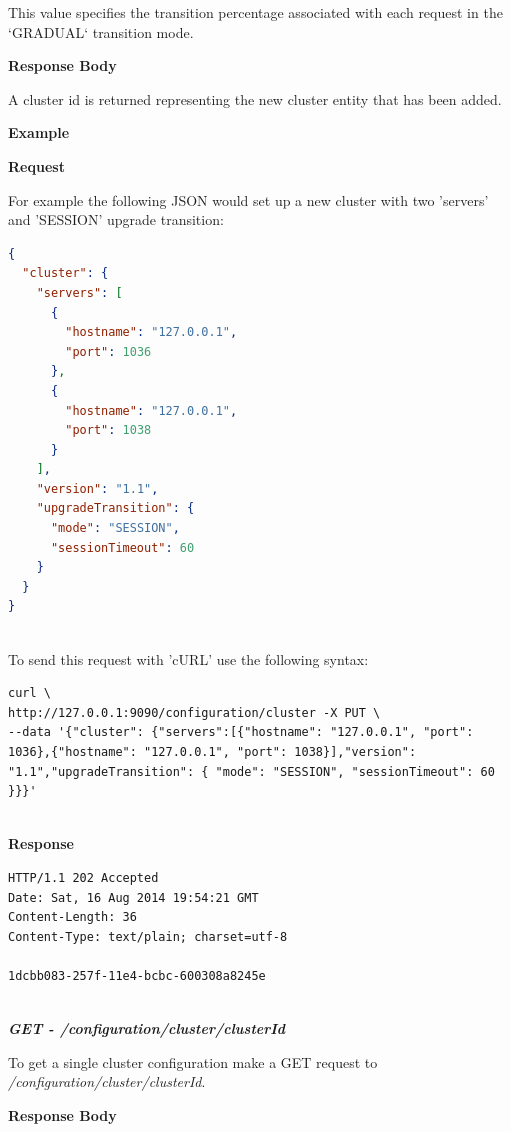 \documentclass[a4paper,11pt,twoside]{report}
\begin{document}
\noindent
This value specifies the transition percentage associated with each request in the `GRADUAL` transition mode. \bigskip

\noindent
\textbf{Response Body}

\noindent
A cluster id is returned representing the new cluster entity that has been added. \bigskip

\noindent
\textbf{Example}\bigskip

\noindent
\textbf{Request}

\noindent
For example the following JSON would set up a new cluster with two 'servers' and 'SESSION' upgrade transition:\bigskip

\begin{lstlisting}[language=json]
{
  "cluster": {
    "servers": [
      {
        "hostname": "127.0.0.1", 
        "port": 1036
      },  
      {
        "hostname": "127.0.0.1", 
        "port": 1038
      }
    ], 
    "version": "1.1", 
    "upgradeTransition": {
      "mode": "SESSION", 
      "sessionTimeout": 60
    }
  }
}
\end{lstlisting}

\noindent \\
To send this request with 'cURL' use the following syntax:\bigskip

\begin{lstlisting}[language=terminal]
curl \
http://127.0.0.1:9090/configuration/cluster -X PUT \
--data '{"cluster": {"servers":[{"hostname": "127.0.0.1", "port": 1036},{"hostname": "127.0.0.1", "port": 1038}],"version": "1.1","upgradeTransition": { "mode": "SESSION", "sessionTimeout": 60 }}}'
\end{lstlisting}

\noindent \\
\textbf{Response}

\begin{lstlisting}[language=terminal]
HTTP/1.1 202 Accepted
Date: Sat, 16 Aug 2014 19:54:21 GMT
Content-Length: 36
Content-Type: text/plain; charset=utf-8
 
1dcbb083-257f-11e4-bcbc-600308a8245e
\end{lstlisting}

\noindent \\
\textit{\textbf{GET - /configuration/cluster/{clusterId}}}\bigskip

\noindent 
To get a single cluster configuration make a GET request to \textit{/configuration/cluster/{clusterId}}.\bigskip 

\noindent 
\textbf{Response Body}
\end{document}
